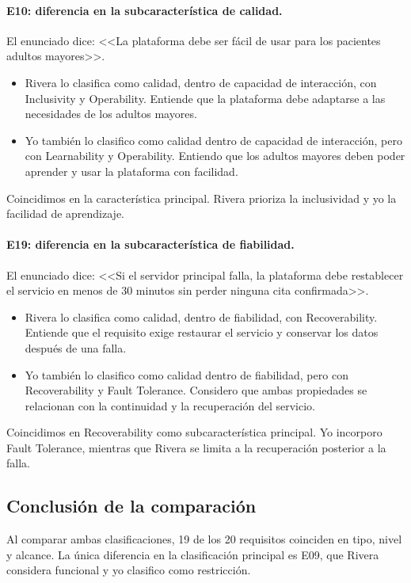\documentclass[11pt,a4paper]{article}
\begin{document}
\paragraph{E10: diferencia en la subcaracterística de calidad.} El enunciado dice: <<La plataforma debe ser fácil de usar para los pacientes adultos mayores>>.
\begin{itemize}
\item Rivera lo clasifica como calidad, dentro de capacidad de interacción, con Inclusivity y Operability. Entiende que la plataforma debe adaptarse a las necesidades de los adultos mayores.
\item Yo también lo clasifico como calidad dentro de capacidad de interacción, pero con Learnability y Operability. Entiendo que los adultos mayores deben poder aprender y usar la plataforma con facilidad.
\end{itemize}
Coincidimos en la característica principal. Rivera prioriza la inclusividad y yo la facilidad de aprendizaje.

\paragraph{E19: diferencia en la subcaracterística de fiabilidad.} El enunciado dice: <<Si el servidor principal falla, la plataforma debe restablecer el servicio en menos de 30 minutos sin perder ninguna cita confirmada>>.
\begin{itemize}
\item Rivera lo clasifica como calidad, dentro de fiabilidad, con Recoverability. Entiende que el requisito exige restaurar el servicio y conservar los datos después de una falla.
\item Yo también lo clasifico como calidad dentro de fiabilidad, pero con Recoverability y Fault Tolerance. Considero que ambas propiedades se relacionan con la continuidad y la recuperación del servicio.
\end{itemize}
Coincidimos en Recoverability como subcaracterística principal. Yo incorporo Fault Tolerance, mientras que Rivera se limita a la recuperación posterior a la falla.

\subsection{Conclusión de la comparación}

Al comparar ambas clasificaciones, 19 de los 20 requisitos coinciden en tipo, nivel y alcance. La única diferencia en la clasificación principal es E09, que Rivera considera funcional y yo clasifico como restricción.
\end{document}
